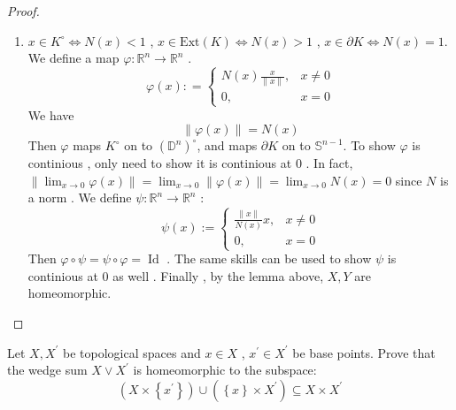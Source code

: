 \documentclass[../main.tex]{subfiles}
\begin{document}
\begin{proof}
\begin{enumerate}
\[        \]That is \[
        \frac{x_1+ x_2 }{N\left( x_1 \right)+ N\left( x_2 \right)+ 2 \delta    }\in K 
        \] for all \(   \delta > 0  \). Then \[
        N\left( x_1+ x_2 \right)\le N\left( x_1 \right)+ N\left( x_2 \right)+ 2 \delta ,\quad \forall  \delta > 0 \implies N\left( x_1+ x_2 \right)\le N\left( x_1 \right)+ N\left( x_2 \right)      
        \] 
        \item    \(  x\in K^{\circ }\iff  N\left( x \right)< 1   \) ,  \(  x \in \mathrm{Ext}\left( K \right)\iff  N\left( x \right)> 1    \) ,  \(  x \in  \partial K  \iff N\left( x \right)= 1 \).    We define a map \(   \varphi : \mathbb{R} ^{n}\to \mathbb{R} ^{n}  \) . \[
         \varphi \left( x \right): =\begin{cases}  N\left( x \right) \frac{x }{\left\| x \right\| }  , &  x\neq 0\\ 0,& x = 0   \end{cases} 
        \]We have  \[
        \left\|  \varphi \left( x \right)  \right\|= N\left( x \right)
        \]   Then \(   \varphi   \) maps  \(  K^{\circ}  \) on to  \(  \left( \mathbb{D} ^{n}\right)^{\circ}    \), and maps \(   \partial K  \) on to \(  \mathbb{S}^{n-1}  \).  To show \(   \varphi   \) is continious , only need to show it is continious at \(  0  \) .  In fact,  \(\left\|  \lim_{x\to 0} \varphi \left( x \right)  \right\|=   \lim_{x\to 0}\left\|  \varphi \left( x \right)  \right\|=\lim_{x\to 0} N\left( x \right)= 0   \) since \(  N  \) is a norm   . We define  \(  \psi : \mathbb{R} ^{n}\to \mathbb{R} ^{n}  \) : \[
        \psi \left( x \right):= \begin{cases} \frac{\left\| x \right\| }{N\left( x \right)  }x ,& x \neq 0\\ 
         0,& x= 0  \end{cases}  
        \]   Then \(   \varphi \circ \psi = \psi \circ  \varphi = \operatorname{Id}  \) .   The same skills can be used to show \(  \psi   \) is continious at \(  0  \)  as well . 
        Finally , by the lemma above, \(  X,Y  \) are homeomorphic.  
    \end{enumerate}
    
\end{proof}

\begin{problem}{}{}
    Let \(  X,X^{\prime}   \) be topological spaces and \(  x \in X  \) , \(  x^{\prime}  \in X^{\prime}   \) be base points. Prove that the wedge sum \(  X \vee X^{\prime}   \) is homeomorphic to the subspace: \[
    \left( X\times \left\{ x^{\prime}  \right\} \right)\cup \left( \left\{ x \right\}\times X^{\prime}  \right)\subseteq  X\times X^{\prime}   
    \]    
\end{problem}
\end{document}
